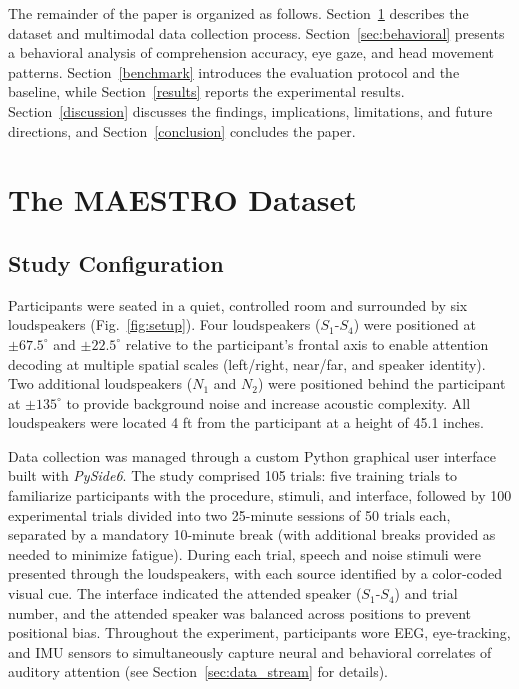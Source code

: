 \documentclass[journal]{IEEEtran}
\begin{document}
The remainder of the paper is organized as follows. Section~\ref{sec:dataset} describes the dataset and multimodal data collection process. Section~\ref{sec:behavioral} presents a behavioral analysis of comprehension accuracy, eye gaze, and head movement patterns. Section~\ref{benchmark} introduces the evaluation protocol and the baseline, while Section~\ref{results} reports the experimental results. Section~\ref{discussion} discusses the findings, implications, limitations, and future directions, and Section~\ref{conclusion} concludes the paper.


\section{The MAESTRO Dataset} \label{sec:dataset}

\subsection{Study Configuration}

Participants were seated in a quiet, controlled room and surrounded by six loudspeakers (Fig.~\ref{fig:setup}). Four loudspeakers ($S_1$-$S_4$) were positioned at $\pm 67.5^{\circ}$ and $\pm 22.5^{\circ}$ relative to the participant's frontal axis to enable attention decoding at multiple spatial scales (left/right, near/far, and speaker identity). Two additional loudspeakers ($N_1$ and $N_2$) were positioned behind the participant at $\pm 135^{\circ}$ to provide background noise and increase acoustic complexity. All loudspeakers were located 4 ft from the participant at a height of 45.1 inches.

Data collection was managed through a custom Python graphical user interface built with \textit{PySide6}. The study comprised 105 trials: five training trials to familiarize participants with the procedure, stimuli, and interface, followed by 100 experimental trials divided into two 25-minute sessions of 50 trials each, separated by a mandatory 10-minute break (with additional breaks provided as needed to minimize fatigue). During each trial, speech and noise stimuli were presented through the loudspeakers, with each source identified by a color-coded visual cue. The interface indicated the attended speaker ($S_1$-$S_4$) and trial number, and the attended speaker was balanced across positions to prevent positional bias. Throughout the experiment, participants wore EEG, eye-tracking, and IMU sensors to simultaneously capture neural and behavioral correlates of auditory attention (see Section~\ref{sec:data_stream} for details).
\end{document}

